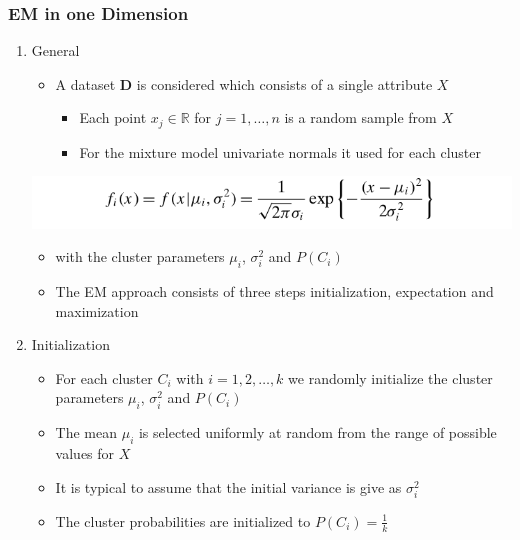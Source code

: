 \documentclass[11pt]{article}
\begin{document}
\subsubsection{EM in one Dimension}
\label{sec:org48f2c10}
\begin{enumerate}
\item General
\label{sec:org4f5f570}
\begin{itemize}
\item A dataset \(\mathbf D\) is considered which consists of a single attribute \(X\)
\begin{itemize}
\item Each point \(x_j \in \mathbb R\) for \(j=1,\dots, n\) is a random sample from \(X\)
\item For the mixture model univariate normals it used for each cluster
\end{itemize}
\end{itemize}
\begin{center}
\includegraphics[width=.9\linewidth]{Representative-based Clustering/screenshot_2018-11-27_20-20-22.png}
\end{center}
\begin{itemize}
\item with the cluster parameters \(\mu_i\), \(\sigma_i^2\) and \(P(C_i)\)

\item The EM approach consists of three steps initialization, expectation and maximization
\end{itemize}

\item Initialization
\label{sec:org80a2bb8}
\begin{itemize}
\item For each cluster \(C_i\) with \(i=1,2,\dots,k\) we randomly initialize the cluster parameters \(\mu_i\), \(\sigma_i^2\) and \(P(C_i)\)
\item The mean \(\mu_i\) is selected uniformly at random from the range of possible values for \(X\)
\item It is typical to assume that the initial variance is give as \(\sigma_i^2\)
\item The cluster probabilities are initialized to \(P(C_i) = \frac1k\)
\end{itemize}


\end{enumerate}
\end{document}
